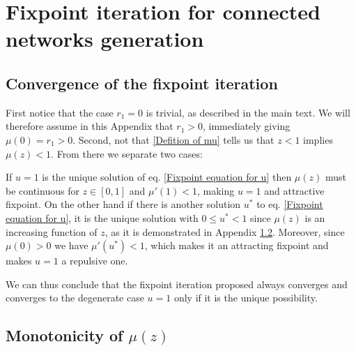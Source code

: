 \documentclass[
11pt, %
english, %
singlespacing, %
nolistspacing, %
liststotoc, %
headsepline, %
]{MastersDoctoralThesis} %
\begin{document}

\appendix  %

\chapter{Fixpoint iteration for connected networks generation}
\section{Convergence of the fixpoint iteration}
\label{Appendix: Fixpoint convergence}

First notice that the case $r_1 = 0$ is trivial, as described in the main text. We will therefore assume in this Appendix that $r_1 > 0$, immediately giving $\mu(0) = r_1 > 0$. Second, not that \eqref{Defition of mu} tells us that $z < 1$ implies $\mu(z) < 1$. From there we separate two cases:

If $u = 1$ is the unique solution of eq. \eqref{Fixpoint equation for u} then $\mu(z)$ must be continuous for $z \in [0, 1]$ and $\mu'(1) < 1$, making $u = 1$ and attractive fixpoint. On the other hand if there is another solution $u^*$ to eq. \eqref{Fixpoint equation for u}, it is the unique solution with $0 \leq u^* < 1$ since $\mu(z)$ is an increasing function of $z$, as it is demonstrated in Appendix \ref{Appendix: Monotonicity}. Moreover, since $\mu(0) > 0$ we have $\mu'(u^*) < 1$, which makes it an attracting fixpoint and makes $u = 1$ a repulsive one.

We can thus conclude that the fixpoint iteration proposed always converges and converges to the degenerate case $u = 1$ only if it is the unique possibility.

\section{Monotonicity of $\mu(z)$}
\label{Appendix: Monotonicity}
\end{document}
